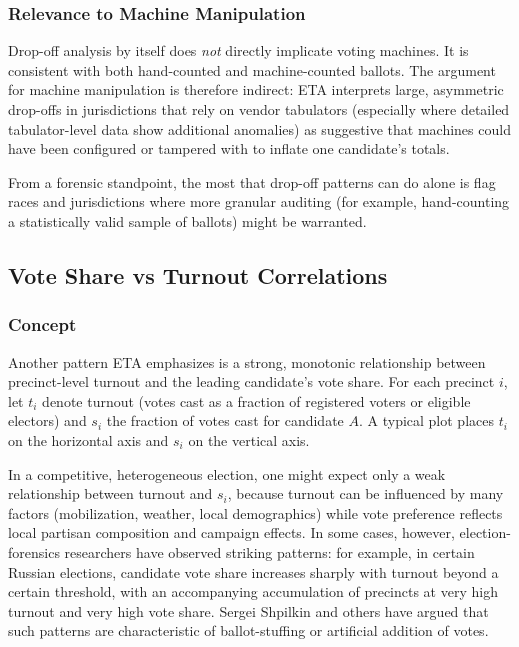 \documentclass[12pt]{article}
\begin{document}
\subsubsection{Relevance to Machine Manipulation}

Drop-off analysis by itself does \emph{not} directly implicate voting machines. It is consistent with both hand-counted and machine-counted ballots. The argument for machine manipulation is therefore indirect: ETA interprets large, asymmetric drop-offs in jurisdictions that rely on vendor tabulators (especially where detailed tabulator-level data show additional anomalies) as suggestive that machines could have been configured or tampered with to inflate one candidate's totals.

From a forensic standpoint, the most that drop-off patterns can do alone is flag races and jurisdictions where more granular auditing (for example, hand-counting a statistically valid sample of ballots) might be warranted.

\subsection{Vote Share vs Turnout Correlations}

\subsubsection{Concept}

Another pattern ETA emphasizes is a strong, monotonic relationship between precinct-level turnout and the leading candidate's vote share. For each precinct $i$, let $t_i$ denote turnout (votes cast as a fraction of registered voters or eligible electors) and $s_i$ the fraction of votes cast for candidate $A$. A typical plot places $t_i$ on the horizontal axis and $s_i$ on the vertical axis.

In a competitive, heterogeneous election, one might expect only a weak relationship between turnout and $s_i$, because turnout can be influenced by many factors (mobilization, weather, local demographics) while vote preference reflects local partisan composition and campaign effects. In some cases, however, election-forensics researchers have observed striking patterns: for example, in certain Russian elections, candidate vote share increases sharply with turnout beyond a certain threshold, with an accompanying accumulation of precincts at very high turnout and very high vote share. Sergei Shpilkin and others have argued that such patterns are characteristic of ballot-stuffing or artificial addition of votes.
\end{document}
